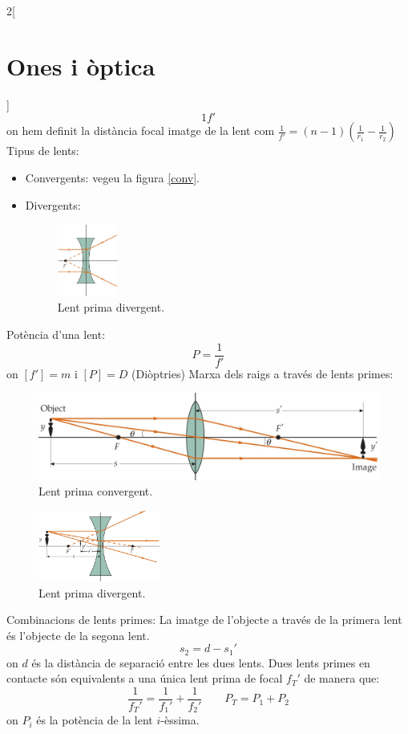 \documentclass[class=article,10pt,crop=false]{standalone}
\begin{document}
\begin{multicols}{2}[\section{Ones i òptica}]
$${1}{f'}$$ {\footnotesize on hem definit la distància focal imatge de la lent com $\frac{
1}{f'}=(n-1)\left(\frac{1}{r_1}-\frac{1}{r_2}\right)$}\newline
Tipus de lents:
\begin{itemize}
    \item Convergents: {\footnotesize vegeu la figura \ref{conv}.}
    \item Divergents:\newline
    \begin{figure}
    \centering
    \includegraphics[width=2cm]{Physics/1st/Ones_i_optica/Imatges/div.jpg} 
    \caption{Lent prima divergent.}
\end{figure}
\end{itemize}
Potència d'una lent: $$P=\frac{1}{f'}$$ {\footnotesize on $[f']=m$ i $[P]=D$ (Diòptries)}\newline
Marxa dels raigs a través de lents primes:
\begin{figure}
    \centering
    \includegraphics[width=\linewidth]{Physics/1st/Ones_i_optica/Imatges/raiglen.jpg} 
    \caption{Lent prima convergent.}
\end{figure}
\begin{figure}
    \centering
    \includegraphics[width=4cm]{Physics/1st/Ones_i_optica/Imatges/raiglen2.jpg} 
    \caption{Lent prima divergent.}
\end{figure}
Combinacions de lents primes: La imatge de l'objecte a través de la primera lent és l'objecte de la segona lent. $$s_2=d-s_1'$$ {\footnotesize on $d$ és la distància de separació entre les dues lents.}
Dues lents primes en contacte són equivalents a una única lent prima de focal $f_T'$ de manera que: $$\frac{1}{f_T'}=\frac{1}{f_1'}+\frac{1}{f_2'}\qquad P_T=P_1+P_2$$ {\footnotesize on $P_i$ és la potència de la lent $i$-èssima.}

\end{multicols}
\end{document}
